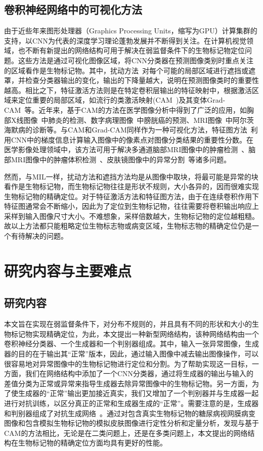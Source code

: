 \subsection{卷积神经网络中的可视化方法}
由于近些年来图形处理器（Graphics Processing Units，缩写为GPU）计算集群的支持，以CNN为代表的深度学习理论蓬勃发展并不断得到关注。在计算机视觉领域，也不断有新提出的网络结构可用于解决在弱监督条件下的生物标记物定位问题。这些方法是通过可视化图像区域，将CNN分类器在预测图像类别时重点关注的区域看作是生物标记物。其中，扰动方法~\cite{zintgraf2017visualizing}对每个可能的局部区域进行遮挡或遮罩，并检查分类器输出的变化，输出的下降量越大，说明在预测图像类时的重要性越高。相比之下，特征激活方法则是在特定卷积层输出的特征映射中，根据激活区域来定位重要的局部区域，如流行的类激活映射(CAM~\cite{zhou2016learning})及其变体Grad-CAM~\cite{selvaraju2017grad}等。近年来，基于CAM的方法在医学图像分析中得到了广泛的应用，如胸部X线图像~\cite{rajpurkar2017chexnet}中肺炎的检测、数字病理图像~\cite{zhang2017mdnet}中膀胱癌的预测、MRI图像~\cite{yang2018visual}中阿尔茨海默病的诊断等。与CAM和Grad-CAM同样作为一种可视化方法，特征图方法~\cite{simonyan2013deep}利用CNN中的梯度信息计算输入图像中的像素点对图像分类结果的重要性分数。在医学影像处理领域中，该方法可用于解决多通道脑部MRI图像中的肿瘤检测~\cite{banerjee2016novel}、脑部MRI图像中的肿瘤体积检测~\cite{mitra2017volumetric}、皮肤镜图像中的异常分割~\cite{jahanifar2018supervised}等诸多问题。

然而，与MIL一样，扰动方法和遮挡方法均是从图像中取块，将最可能是异常的块看作是生物标记物，而生物标记物往往是形状不规则，大小各异的，因而很难实现生物标记物的精确定位。对于特征激活方法和特征图方法，由于在连续卷积作用下特征图通常会不断缩小，因此为了定位到生物标记物，往往需要将卷积输出响应上采样到输入图像尺寸大小。不难想象，采样倍数越大，生物标记物的定位越粗糙。故以上方法都只能粗略定位生物标志物或病变区域，生物标志物的精确定位仍是一个有待解决的问题。


\section{研究内容与主要难点}\label{sec:existing_diffcuities}
\subsection{研究内容}
本文旨在实现在弱监督条件下，对分布不规则的，并且具有不同的形状和大小的生物标记物实现精确定位，为此，本文提出一种新型网络结构，该种网络结构由一个卷积神经分类器、一个生成器和一个判别器组成。其中，输入一张异常图像，生成器的目的在于输出其“正常”版本，因此，通过输入图像中减去输出图像操作，可以很容易地对异常图像中的生物标记物进行定位和分割。为了帮助实现这一目标，一方面，我们在网络结构中添加了一个CNN分类器，通过将生成器的输出与输入的差值分类为正常或异常来指导生成器去除异常图像中的生物标记物。另一方面，为了使生成器的“正常”输出更加接近真实，我们又增加了一个判别器并与生成器一起进行对抗训练，以区分真正的正常和生成器生成的“正常”。需要注意的是，生成器和判别器组成了对抗生成网络~\cite{goodfellow2014generative}。通过对包含真实生物标记物的糖尿病视网膜病变图像和包含模拟生物标记物的模拟皮肤图像进行定性分析和定量分析，发现与基于CAM的方法相比，无论是在二类问题上，还是在多类问题上，本文提出的网络结构在生物标记物的精确定位方面均具有更好的性能。

